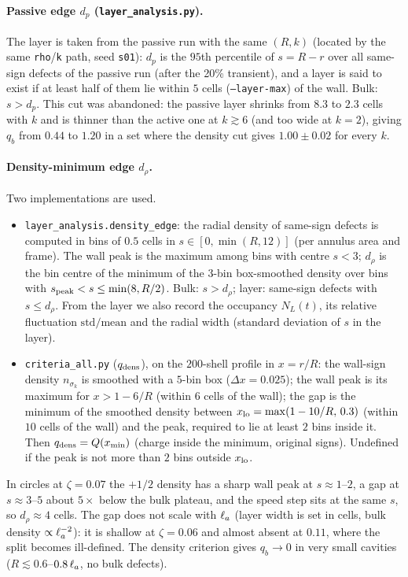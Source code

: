 \paragraph{Passive edge $d_p$ (\texttt{layer\_analysis.py}).}
The layer is taken from the passive run with the same $(R,k)$ (located by the same \texttt{rho}/\texttt{k}
path, seed \texttt{s01}): $d_p$ is the $95$th percentile of $s=R-r$ over all same-sign defects of the passive
run (after the 20\% transient), and a layer is said to exist if at least half of them lie within $5$ cells
(\texttt{--layer-max}) of the wall. Bulk: $s>d_p$. This cut was abandoned: the passive layer shrinks
from $8.3$ to $2.3$ cells with $k$ and is thinner than the active one at $k\gtrsim6$ (and too wide at $k=2$),
giving $q_b$ from $0.44$ to $1.20$ in a set where the density cut gives $1.00\pm0.02$ for every $k$.

\paragraph{Density-minimum edge $d_\rho$.}
Two implementations are used.
\begin{itemize}
  \item \texttt{layer\_analysis.density\_edge}: the radial density of same-sign defects is computed in
        bins of $0.5$ cells in $s\in[0,\min(R,12)]$ (per annulus area and frame). The wall peak is the
        maximum among bins with centre $s<3$; $d_\rho$ is the bin centre of the minimum of the $3$-bin box-smoothed
        density over bins with $s_{\rm peak}<s\le\min(8,R/2)$. Bulk: $s>d_\rho$; layer: same-sign defects with
        $s\le d_\rho$. From the layer we also record the occupancy $N_L(t)$, its relative fluctuation
        $\mathrm{std}/\mathrm{mean}$ and the radial width (standard deviation of $s$ in the layer).
  \item \texttt{criteria\_all.py} ($q_{\rm dens}$), on the $200$-shell profile in $x=r/R$: the wall-sign density
        $n_{\sigma_k}$ is smoothed with a $5$-bin box ($\Delta x=0.025$); the wall peak is its maximum for
        $x>1-6/R$ (within $6$ cells of the wall); the gap is the minimum of the smoothed density between
        $x_{\rm lo}=\max(1-10/R,\,0.3)$ (within $10$ cells of the wall) and the peak, required to lie at
        least $2$ bins inside it. Then $q_{\rm dens}=Q(x_{\min})$ (charge inside the minimum, original signs).
        Undefined if the peak is not more than $2$ bins outside $x_{\rm lo}$.
\end{itemize}
In circles at $\zeta=0.07$ the $+1/2$ density has a sharp wall peak at $s\approx1$--$2$, a gap at
$s\approx3$--$5$ about $5\times$ below the bulk plateau, and the speed step sits at the same $s$, so
$d_\rho\approx4$ cells. The gap does not scale with $\ell_a$ (layer width is set in cells, bulk density
$\propto\ell_a^{-2}$): it is shallow at $\zeta=0.06$ and almost absent at $0.11$, where the split becomes
ill-defined. The density criterion gives $q_b\to0$ in very small cavities ($R\lesssim0.6$--$0.8\,\ell_a$,
no bulk defects).

